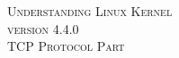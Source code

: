 \begin{titlepage}
    \makeatletter                           %
    \centering                              %
    \mbox{}                                 %
    \vfill                                  %
    \textsc{\Large 
    Understanding Linux Kernel\\            %
    version 4.4.0}\\
    \textsc{\Large TCP Protocol Part}\\
    \textsc{\LARGE \@title}\\               %
    [2.5cm]
    \textsc{\@author}\\
    [0.5cm]
    \textsc{\@date}
    \vfill                                  %
\end{titlepage}
\clearpage
\ClearWallPaper
